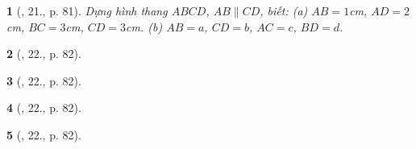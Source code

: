 \documentclass{article}
\newtheorem{baitoan}{}
\begin{document}
\begin{baitoan}[\cite{Binh_Toan_8_tap_1}, 21., p. 81]
	Dựng hình thang $ABCD$, $AB\parallel CD$, biết: (a) $AB = 1${\rm cm}, $AD = 2${\rm cm}, $BC = 3${\rm cm}, $CD = 3${\rm cm}. (b) $AB = a$, $CD = b$, $AC = c$, $BD = d$.
\end{baitoan}

\begin{baitoan}[\cite{Binh_Toan_8_tap_1}, 22., p. 82]
	
\end{baitoan}

\begin{baitoan}[\cite{Binh_Toan_8_tap_1}, 22., p. 82]
	
\end{baitoan}

\begin{baitoan}[\cite{Binh_Toan_8_tap_1}, 22., p. 82]
	
\end{baitoan}

\begin{baitoan}[\cite{Binh_Toan_8_tap_1}, 22., p. 82]
	
\end{baitoan}




\printbibliography[heading=bibintoc]
	
\end{document}

